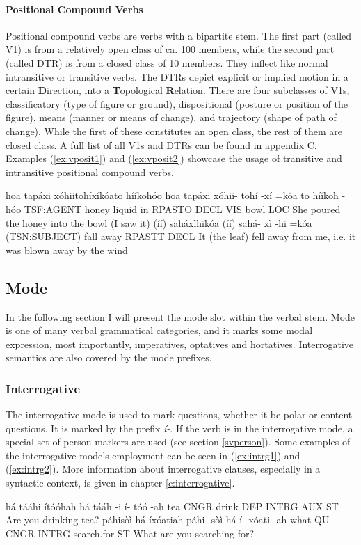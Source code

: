 \documentclass[a4paper, 12pt, oneside]{memoir}
\newcommand{\emh}[1]{\textit{#1}}
\begin{document}
\paragraph{Positional Compound Verbs}
Positional compound verbs are verbs with a bipartite stem. The first part (called V1) is from a relatively open class of ca. 100 members, while the second part (called DTR) is from a closed class of 10 members. They inflect like normal intransitive or transitive verbs. The DTRs depict explicit or implied motion in a certain \textbf{D}irection, into a \textbf{T}opological \textbf{R}elation. There are four subclasses of V1s, classificatory (type of figure or ground), dispositional (posture or position of the figure), means (manner or means of change), and trajectory (shape of path of change). While the first of these constitutes an open class, the rest of them are closed class. A full list of all V1s and DTRs can be found in appendix C. Examples (\ref{ex:vposit1}) and (\ref{ex:vposit2}) showcase the usage of transitive and intransitive positional compound verbs.
\begin{examples}
\newbaarucmd{\cl}{\baarujuncture{\texttt{==}}}
    \ex \label{ex:vposit1}
    \words hoa tapáxi xóhiitohíxíkóato hííkohóo
    \bits hoa tapáxi xóhii- tohí -xí =kóa \cl to hííkoh -hóo
    \gloss TSF:AGENT honey liquid in RPASTO DECL VIS bowl LOC
    \tr She poured the honey into the bowl (I saw it)
    \ex \label{ex:vposit2}
    \words (íí) saháxìhikóa
    \bits (íí) sahá- xì -hi =kóa 
    \gloss (TSN:SUBJECT) fall away RPASTT DECL
    \tr It (the leaf) fell away from me, i.e. it was blown away by the wind
\end{examples}

\subsection{Mode}\label{svmode}
In the following section I will present the mode slot within the verbal stem. Mode is one of many verbal grammatical categories, and it marks some modal expression, most importantly, imperatives, optatives and hortatives. Interrogative semantics are also covered by the mode prefixes. 
\subsubsection{Interrogative}
The interrogative mode is used to mark questions, whether it be polar or content questions. It is marked by the prefix \emh{í-}. If the verb is in the interrogative mode, a special set of person markers are used (see section \ref{svperson}). Some examples of the interrogative mode's employment can be seen in (\ref{ex:intrg1}) and (\ref{ex:intrg2}). More information about interrogative clauses, especially in a syntactic context, is given in chapter \ref{c:interrogative}.
\begin{examples}
    \ex \label{ex:intrg1}
     há tááhi ítóóhah
     há tááh -i í- tóó -ah
    \gloss tea CNGR drink DEP INTRG AUX ST 
    \tr Are you drinking tea?
    \ex \label{ex:intrg2}
    \words páhisòì há íxóatiah 
    \bits páhi -sòì há í- xóati -ah
    \gloss what QU CNGR INTRG search.for ST
    \tr What are you searching for?
\end{examples}
\end{document}

